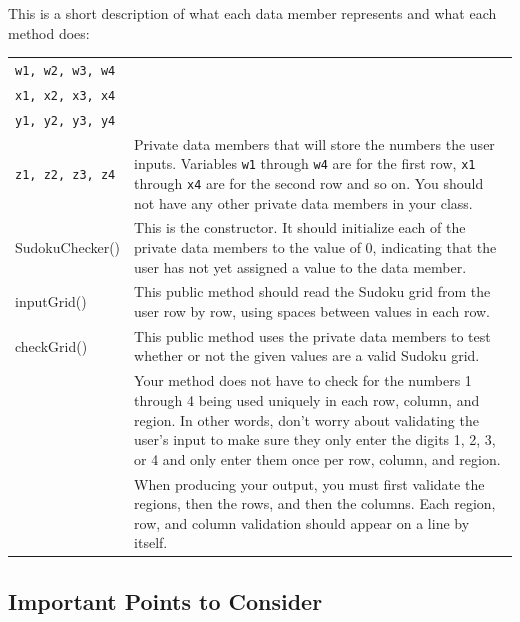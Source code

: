 \vspace*{.05in}
\noindent This is a short description of what each data member represents and what each method does:\\

\begin{tabular}{|l|p{10cm}|}
\hline
{\tt w1, w2, w3, w4} &  \\
{\tt x1, x2, x3, x4} & \\
{\tt y1, y2, y3, y4} & \\
{\tt z1, z2, z3, z4}    &  Private data members that will store the numbers the user inputs.  Variables {\tt w1} through {\tt w4}
are for the first row, {\tt x1} through {\tt x4} are for the second row
and so on. You should not have any other private data members in your class.\\
\hline
SudokuChecker() &This is the constructor.  It should initialize each of the private data members to the value of 0, indicating
that the user has not yet assigned a value to the data member. \\
\hline

inputGrid()   & This public method should read the Sudoku grid from the user row by row, using spaces between values in each row.\\
\hline
checkGrid() &   This public method uses the private data members to test whether or not the given values are a valid Sudoku grid.\\
& Your method does not have to check for the numbers 1 through 4 being used uniquely in each row, column, and region.
In other words, don't worry about validating the user's input to make sure they only enter the digits 1, 2, 3, or 4 and only
enter them once per row, column, and region. \\
& When producing your output, you must first validate the regions, then the rows, and then the columns.  Each region,
row, and column validation should appear on a line by itself. \\
\hline
\end{tabular}

\vspace{-0.05in}
\subsection*{Important Points to Consider}
\vspace{-0.05in}

